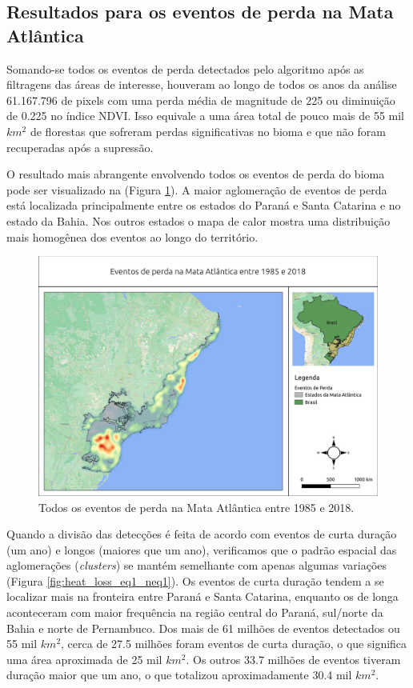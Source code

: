 \subsection{Resultados para os eventos de perda na Mata Atlântica}
\hspace{13pt} Somando-se todos os eventos de perda detectados pelo algoritmo após as filtragens das áreas de interesse, houveram ao longo de todos os anos da análise 61.167.796 de pixels com uma perda média de magnitude de 225 ou diminuição de 0.225 no índice NDVI. Isso equivale a uma área total de pouco mais de 55 mil $ km^2 $ de florestas que sofreram perdas significativas no bioma e que não foram recuperadas após a supressão.

O resultado mais abrangente envolvendo todos os eventos de perda do bioma pode ser visualizado na (Figura \ref{fig:heat_loss_masked85_maskedgain}). A maior aglomeração de eventos de perda está localizada principalmente entre os estados do Paraná e Santa Catarina e no estado da Bahia. Nos outros estados o mapa de calor mostra uma distribuição mais homogênea dos eventos ao longo do território. 

\begin{figure}[H]
    \centering
    \includegraphics[scale=.5]{images/heatmap_loss_masked85_maskedgain.pdf}
    \caption{Todos os eventos de perda na Mata Atlântica entre 1985 e 2018.}
    \label{fig:heat_loss_masked85_maskedgain}
\end{figure}

Quando a divisão das detecções é feita de acordo com eventos de curta duração (um ano) e longos (maiores que um ano), verificamos que o padrão espacial das aglomerações (\textit{clusters}) se mantém semelhante com apenas algumas variações (Figura \ref{fig:heat_loss_eq1_neq1}). Os eventos de curta duração tendem a se localizar mais na fronteira entre Paraná e Santa Catarina, enquanto os de longa aconteceram com maior frequência na região central do Paraná, sul/norte da Bahia e norte de Pernambuco. Dos mais de 61 milhões de eventos detectados ou 55 mil $ km^2 $, cerca de 27.5 milhões foram eventos de curta duração, o que significa uma área aproximada de 25 mil $ km^2 $. Os outros 33.7 milhões de eventos tiveram duração maior que um ano, o que totalizou aproximadamente 30.4 mil $ km^2 $.

